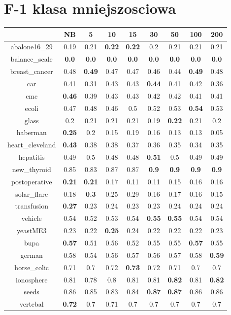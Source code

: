 \documentclass{article}%
\begin{document}
%
\section*{F{-}1 klasa mniejszosciowa}%
\begin{tabular}{c|cccccccc}%
\hline%
&NB&5&10&15&30&50&100&200\\%
\hline%
abalone16\_29&0.19&0.21&\textbf{0.22}&\textbf{0.22}&0.2&0.21&0.21&0.21\\%
\hline%
balance\_scale&\textbf{0.0}&\textbf{0.0}&\textbf{0.0}&\textbf{0.0}&\textbf{0.0}&\textbf{0.0}&\textbf{0.0}&\textbf{0.0}\\%
\hline%
breast\_cancer&0.48&\textbf{0.49}&0.47&0.47&0.46&0.44&\textbf{0.49}&0.48\\%
\hline%
car&0.41&0.31&0.43&0.43&\textbf{0.44}&0.41&0.42&0.36\\%
\hline%
cmc&\textbf{0.46}&0.39&0.43&0.43&0.42&0.42&0.41&0.41\\%
\hline%
ecoli&0.47&0.48&0.46&0.5&0.52&0.53&\textbf{0.54}&0.53\\%
\hline%
glass&0.2&0.21&0.21&0.21&0.19&\textbf{0.22}&0.21&0.2\\%
\hline%
haberman&\textbf{0.25}&0.2&0.15&0.19&0.16&0.13&0.13&0.05\\%
\hline%
heart\_cleveland&\textbf{0.43}&0.38&0.38&0.37&0.36&0.35&0.34&0.35\\%
\hline%
hepatitis&0.49&0.5&0.48&0.48&\textbf{0.51}&0.5&0.49&0.49\\%
\hline%
new\_thyroid&0.85&0.83&0.87&0.87&\textbf{0.9}&\textbf{0.9}&\textbf{0.9}&\textbf{0.9}\\%
\hline%
postoperative&\textbf{0.21}&\textbf{0.21}&0.17&0.11&0.11&0.15&0.16&0.16\\%
\hline%
solar\_flare&0.18&\textbf{0.3}&0.25&0.29&0.16&0.17&0.16&0.15\\%
\hline%
transfusion&\textbf{0.27}&0.23&0.24&0.23&0.23&0.24&0.24&0.24\\%
\hline%
vehicle&0.54&0.52&0.53&0.54&\textbf{0.55}&\textbf{0.55}&0.54&0.54\\%
\hline%
yeastME3&0.23&0.22&\textbf{0.25}&0.24&0.22&0.22&0.22&0.23\\%
\hline%
bupa&\textbf{0.57}&0.51&0.56&0.52&0.55&0.55&\textbf{0.57}&0.55\\%
\hline%
german&0.58&0.54&0.56&0.57&0.56&0.57&0.58&\textbf{0.59}\\%
\hline%
horse\_colic&0.71&0.7&0.72&\textbf{0.73}&0.72&0.71&0.7&0.7\\%
\hline%
ionosphere&0.81&0.78&0.8&0.81&0.81&\textbf{0.82}&0.81&\textbf{0.82}\\%
\hline%
seeds&0.86&0.85&0.83&0.84&\textbf{0.87}&\textbf{0.87}&0.86&0.86\\%
\hline%
vertebal&\textbf{0.72}&0.7&0.71&0.7&0.7&0.7&0.7&0.7\\%
\hline%
\end{tabular}
\end{document}
